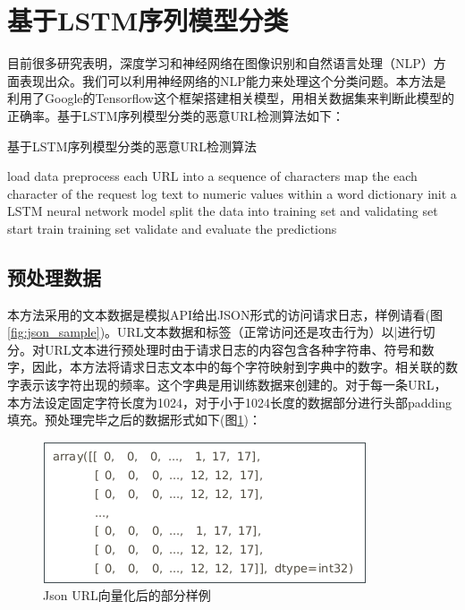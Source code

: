 \section{基于LSTM序列模型分类}
目前很多研究表明，深度学习和神经网络在图像识别和自然语言处理（NLP）方面表现出众。我们可以利用神经网络的NLP能力来处理这个分类问题。本方法是利用了Google的Tensorflow这个框架搭建相关模型，用相关数据集来判断此模型的正确率。基于LSTM序列模型分类的恶意URL检测算法如下：
\begin{algorithm}[!h]
    \SetAlgoNoLine
    \caption{基于LSTM序列模型分类的恶意URL检测算法}
    load data\; 
    preprocess each URL into a sequence of characters\;
    map the each character of the request log text to numeric values within a word dictionary\;
    init a LSTM neural network model\;
    split the data into training set and validating set\;
    start train training set\;
    validate and evaluate the predictions\;
\end{algorithm}
\subsection{预处理数据}
本方法采用的文本数据是模拟API给出JSON形式的访问请求日志，样例请看(图\ref{fig:json_sample})。URL文本数据和标签（正常访问还是攻击行为）以|进行切分。对URL文本进行预处理时由于请求日志的内容包含各种字符串、符号和数字，因此，本方法将请求日志文本中的每个字符映射到字典中的数字。相关联的数字表示该字符出现的频率。这个字典是用训练数据来创建的。对于每一条URL，本方法设定固定字符长度为1024，对于小于1024长度的数据部分进行头部padding填充。预处理完毕之后的数据形式如下(图\ref{fig:vec2})：
\begin{figure}[!h]
    \setlength{\abovecaptionskip}{0.cm}
    \setlength{\belowcaptionskip}{-0.cm}
    \centering
     \includegraphics[scale=0.5]{Figs/vec2.png}
    \caption{Json URL向量化后的部分样例}
    \label{fig:vec2}
\end{figure}
